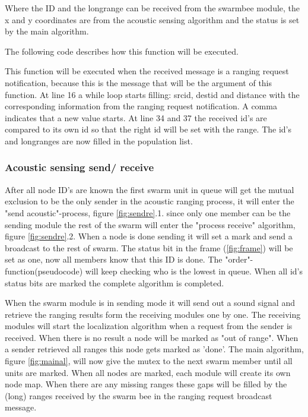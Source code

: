 \documentclass[10pt,a4paper]{article}
\begin{document}
Where the ID and the longrange can be received from the swarmbee module, the x and y coordinates are from the acoustic sensing algorithm and the status is set by the main algorithm.

The following code describes how this function will be executed.


This function will be executed when the received message is a ranging request notification, because this is the message that will be the argument of this function. At line 16 a while loop starts filling: srcid, destid and distance with the corresponding information from the ranging request notification. A comma indicates that a new value starts. At line 34 and 37 the received id's are compared to its own id so that the right id will be set with the range. The id's and longranges are now filled in the population list.  

\subsubsection{Acoustic sensing send/ receive}
After all node ID's are known the first swarm unit in queue will get the mutual exclusion to be the only sender in the acoustic ranging process, it will enter the "send acoustic"-process, figure \ref{fig:sendre}.1. since only one member can be the sending module the rest of the swarm will enter the "process receive" algorithm, figure \ref{fig:sendre}.2. When a node is done sending it will set a mark and send a broadcast to the rest of swarm. The status bit in the frame (\ref{fig:frame}) will be set as one, now all members know that this ID is done. The "order"-function(pseudocode) will keep checking who is the lowest in queue. When all id's status bits are marked the complete algorithm is completed.



When the swarm module is in sending mode it will send out a sound signal and retrieve the ranging results form the receiving modules one by one. The receiving modules will start the localization algorithm when a request from the sender is received. When there is no result a node will be marked as "out of range". When a sender retrieved all ranges this node gets marked as 'done'. The main algorithm, figure \ref{fig:mainal}, will now give the mutex to the next swarm member until all units are marked. When all nodes are marked, each module will create its own node map. When there are any missing ranges these gaps will be filled by the (long) ranges received by the swarm bee in the ranging request broadcast message.
\end{document}

